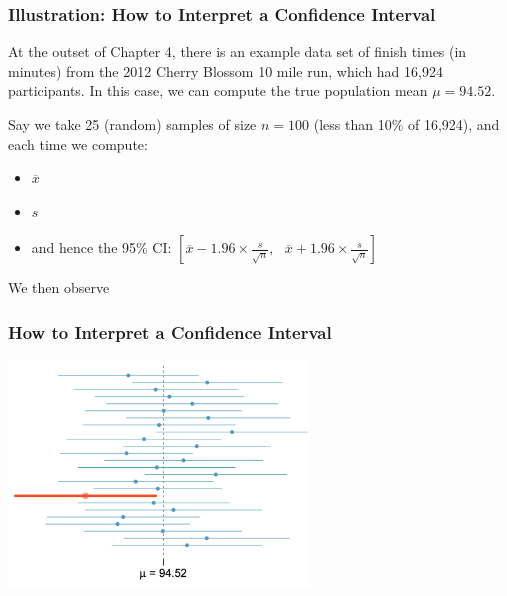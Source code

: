 \documentclass[handout]{beamer}
\newcommand{\blue}[1]{\textcolor{blue2}{#1}}
\newcommand{\xbar}{\overline{x}}
\begin{document}
\begin{frame}
\frametitle{Illustration:  How to Interpret a Confidence Interval}
At the outset of Chapter 4, there is an example data set of finish times (in minutes) from the 2012 Cherry Blossom 10 mile run, which had 16,924 participants.  In this case, we can compute the \blue{true} population mean $\mu=94.52$.

\vspace{0.5cm}

\pause Say we take 25 (random) samples of size $n=100$ (less than 10\% of 16,924), and each time we compute:
\begin{itemize}
\item $\xbar$
\item $s$
\item and hence the 95\% CI:  $\left[
\overline{x} - 1.96 \times\frac{s}{\sqrt n}, \mbox{  }
\overline{x} + 1.96 \times\frac{s}{\sqrt n}
\right]$
\end{itemize}
\pause We then observe
\end{frame}



\begin{frame}
\frametitle{How to Interpret a Confidence Interval}

\begin{center}
\includegraphics[width=8cm]{figure/CI.png}
\end{center}

\end{frame}
\end{document}
